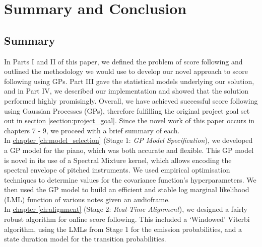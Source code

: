 \chapter{Summary and Conclusion}{\label{ch:conclusion}}

\section{Summary}
In Parts I and II of this paper, we defined the problem of score following and outlined the methodology we would use to develop our novel approach to score following using GPs.
Part III gave the statistical models underlying our solution, and in Part IV, we described our implementation and showed that the solution performed highly promisingly. Overall, we have achieved successful score following using Gaussian Processes (GPs), therefore fulfilling the original project goal set out in \hyperref[section:project_goal]{section \ref*{section:project_goal}}. Since the novel work of this paper occurs in chapters 7 - 9, we proceed with a brief summary of each.\\

In \hyperref[ch:model_selection]{chapter \ref*{ch:model_selection}} (Stage 1: \textit{GP Model Specification}), we developed a GP model for the piano, which was both accurate and flexible. This GP model is novel in its use of a Spectral Mixture kernel, which  allows encoding the spectral envelope of pitched instruments. We used empirical optimisation techniques to determine values for the covariance function's hyperparameters. We then used the GP model to build an efficient and stable log marginal likelihood (LML) function of various notes given an audioframe.\\


In  \hyperref[ch:alignment]{chapter \ref*{ch:alignment}} (Stage 2: \textit{Real-Time Alignment}), we designed a fairly robust algorithm for online score following. This included a `Windowed' Viterbi algorithm, using the LMLs from Stage 1 for the emission probabilities, and a state duration model for the transition probabilities.  \\


